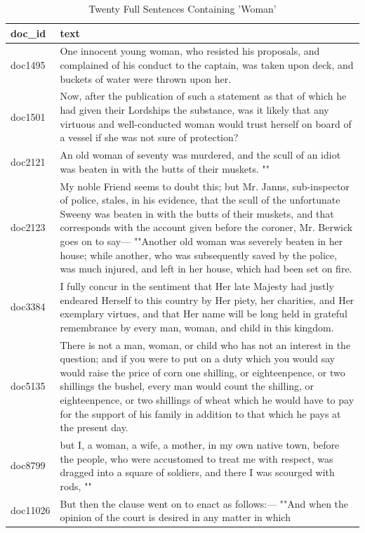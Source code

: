 \documentclass[
]{article}
\begin{document}
\begin{longtable}[t]{ll}
\caption{\label{tab:woman_sentences_table}Twenty Full Sentences Containing 'Woman'}\\
\toprule
doc\_id & text\\
\midrule
doc1495 & One innocent young woman, who resisted his proposals, and
complained of his conduct to the captain, was taken upon
deck, and buckets of water were thrown upon her.\\
doc1501 & Now, after the publication of such a statement as that of
which he had given their Lordships the substance, was it
likely that any virtuous and well-conducted woman would
trust herself on board of a vessel if she was not sure of
protection?\\
doc2121 & An old woman of seventy was murdered, and the scull of an
idiot was beaten in with the butts of their muskets. ""\\
doc2123 & My noble Friend seems to doubt this; but Mr. Janns,
sub-inspector of police, stales, in his evidence, that the
scull of the unfortunate Sweeny was beaten in with the butts
of their muskets, and that corresponds with the account
given before the coroner, Mr. Berwick goes on to say—
""Another old woman was severely beaten in her house; while
another, who was subsequently saved by the police, was much
injured, and left in her house, which had been set on fire.\\
doc3384 & I fully concur in the sentiment that Her late Majesty had
justly endeared Herself to this country by Her piety, her
charities, and Her exemplary virtues, and that Her name will
be long held in grateful remembrance by every man, woman,
and child in this kingdom.\\
\addlinespace
doc5135 & There is not a man, woman, or child who has not an interest
in the question; and if you were to put on a duty which you
would say would raise the price of corn one shilling, or
eighteenpence, or two shillings the bushel, every man would
count the shilling, or eighteenpence, or two shillings of
wheat which he would have to pay for the support of his
family in addition to that which he pays at the present day.\\
doc8799 & but I, a woman, a wife, a mother, in my own native town,
before the people, who were accustomed to treat me with
respect, was dragged into a square of soldiers, and there I
was scourged with rods, ""\\
doc11026 & But then the clause went on to enact as follows:— ""And when
the opinion of the court is desired in any matter in which

\end{longtable}
\end{document}
